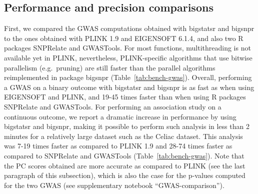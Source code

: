 \documentclass{bioinfo}
\begin{document}
\subsection{Performance and precision comparisons}

First, we compared the GWAS computations obtained with bigstatsr and bigsnpr to the ones obtained with PLINK 1.9 and EIGENSOFT 6.1.4, and also two R packages SNPRelate and GWASTools.
For most functions, multithreading is not available yet in PLINK, nevertheless, PLINK-specific algorithms that use bitwise parallelism (e.g.\ pruning) are still faster than the parallel algorithms reimplemented in package bigsnpr (Table~\ref{tab:bench-gwas}). 
Overall, performing a GWAS on a binary outcome with bigstatsr and bigsnpr is as fast as when using EIGENSOFT and PLINK, and 19-45 times faster than when using R packages SNPRelate and GWASTools. 
For performing an association study on a continuous outcome, we report a dramatic increase in performance by using bigstatsr and bigsnpr, making it possible to perform such analysis in less than 2 minutes for a relatively large dataset such as the Celiac dataset. This analysis was 7-19 times faster as compared to PLINK 1.9 and 28-74 times faster as compared to SNPRelate and GWASTools (Table~\ref{tab:bench-gwas}).
Note that the PC scores obtained are more accurate as compared to PLINK (see the last paragraph of this subsection), which is also the case for the p-values computed for the two GWAS (see supplementary notebook ``GWAS-comparison''). 
\end{document}
